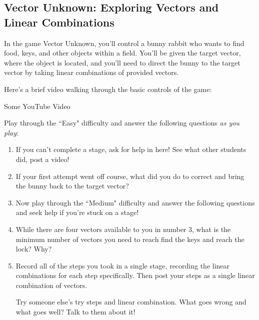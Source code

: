 \documentclass{ximera}
\begin{document}
  \subsection*{Vector Unknown: Exploring Vectors and Linear Combinations}

  In the game Vector Unknown, you'll control a bunny rabbit who wants to find food, keys, and other objects within a field. You'll be given the target vector, where the object is located, and you'll need to direct the bunny to the target vector by taking linear combinations of provided vectors. 

  Here's a brief video walking through the basic controls of the game:

  \begin{center}
    Some YouTube Video
  \end{center}

  \begin{exploration}

  Play through the ``Easy" difficulty and answer the following questions \emph{as you play}:
  \begin{enumerate}

    \item If you can't complete a stage, ask for help in here! See what other students did, post a video!

    \item If your first attempt went off course, what did you do to correct and bring the bunny back to the target vector?
    

    \item Now play through the ``Medium" difficulty and answer the following questions and seek help if you're stuck on a stage!
    
    \item While there are four vectors available to you in number 3, what is the minimum number of vectors you need to reach find the keys and reach the lock? Why?
    
    \item Record all of the steps you took in a single stage, recording the linear combinations for each step specifically. Then post your steps as a single linear combination of vectors.
    
    Try someone else's try steps and linear combination. What goes wrong and what goes well? Talk to them about it!

  \end{enumerate}
\end{exploration}
\end{document}
